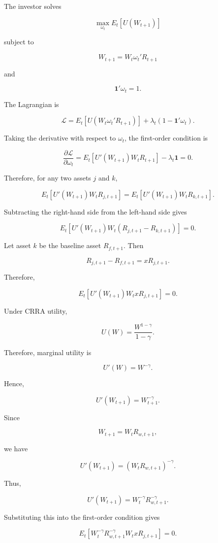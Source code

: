 \documentclass{article}
\begin{document}
The investor solves

\[
\max_{\omega_t}
E_t[U(W_{t+1})]
\]

subject to

\[
W_{t+1}
=
W_t\omega_t'R_{t+1}
\]

and

\[
\mathbf{1}'\omega_t=1.
\]

The Lagrangian is

\[
\mathcal{L}
=
E_t
\left[
U\left(
W_t\omega_t'R_{t+1}
\right)
\right]
+
\lambda_t
\left(
1-\mathbf{1}'\omega_t
\right).
\]

Taking the derivative with respect to \(\omega_t\), the first-order condition is

\[
\frac{\partial \mathcal{L}}{\partial \omega_t}
=
E_t
\left[
U'(W_{t+1})
W_tR_{t+1}
\right]
-
\lambda_t\mathbf{1}
=
0.
\]

Therefore, for any two assets \(j\) and \(k\),

\[
E_t
\left[
U'(W_{t+1})W_tR_{j,t+1}
\right]
=
E_t
\left[
U'(W_{t+1})W_tR_{k,t+1}
\right].
\]

Subtracting the right-hand side from the left-hand side gives

\[
E_t
\left[
U'(W_{t+1})W_t
\left(
R_{j,t+1}-R_{k,t+1}
\right)
\right]
=
0.
\]

Let asset \(k\) be the baseline asset \(R_{f,t+1}\). Then

\[
R_{j,t+1}-R_{f,t+1}
=
xR_{j,t+1}.
\]

Therefore,

\[
E_t
\left[
U'(W_{t+1})W_t
xR_{j,t+1}
\right]
=
0.
\]

Under CRRA utility,

\[
U(W)
=
\frac{W^{1-\gamma}}{1-\gamma}.
\]

Therefore, marginal utility is

\[
U'(W)
=
W^{-\gamma}.
\]

Hence,

\[
U'(W_{t+1})
=
W_{t+1}^{-\gamma}.
\]

Since

\[
W_{t+1}
=
W_tR_{w,t+1},
\]

we have

\[
U'(W_{t+1})
=
\left(
W_tR_{w,t+1}
\right)^{-\gamma}.
\]

Thus,

\[
U'(W_{t+1})
=
W_t^{-\gamma}
R_{w,t+1}^{-\gamma}.
\]

Substituting this into the first-order condition gives

\[
E_t
\left[
W_t^{-\gamma}
R_{w,t+1}^{-\gamma}
W_t
xR_{j,t+1}
\right]
=
0.
\]
\end{document}
